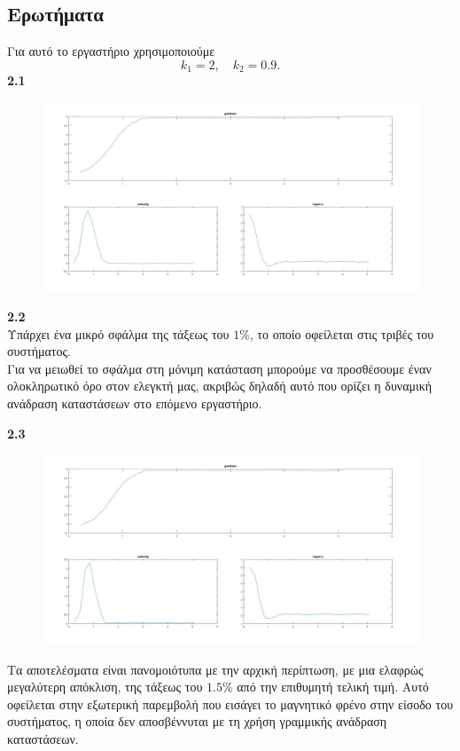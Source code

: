 \documentclass[12pt]{article}
\begin{document}
\subsection*{Ερωτήματα}
Για αυτό το εργαστήριο χρησιμοποιούμε 
\begin{equation*}
    k_1 = 2, \quad k_2 = 0.9.
\end{equation*} 
\textbf{2.1} 
\begin{figure}[H]
    \centering
    \includegraphics*[scale=0.25]{lab2a_all.jpg}
\end{figure} 
\textbf{2.2} \\
Υπάρχει ένα μικρό σφάλμα της τάξεως του \(1\%\), το οποίο οφείλεται στις τριβές του συστήματος. \\
Για να μειωθεί το σφάλμα στη μόνιμη κατάσταση μπορούμε να προσθέσουμε έναν ολοκληρωτικό όρο στον ελεγκτή μας, ακριβώς δηλαδή αυτό που ορίζει η δυναμική ανάδραση καταστάσεων στο επόμενο εργαστήριο. 
\bigskip

\textbf{2.3} 
\begin{figure}[H]
    \centering
    \includegraphics*[scale=0.25]{lab2c_all.jpg}
\end{figure}
Τα αποτελέσματα είναι πανομοιότυπα με την αρχική περίπτωση, με μια ελαφρώς μεγαλύτερη απόκλιση, της τάξεως του \(1.5\%\) από την επιθυμητή τελική τιμή. Αυτό οφείλεται στην εξωτερική παρεμβολή που εισάγει το μαγνητικό φρένο στην είσοδο του συστήματος, η οποία δεν αποσβέννυται με τη χρήση γραμμικής ανάδραση καταστάσεων.
\bigskip
\end{document}
